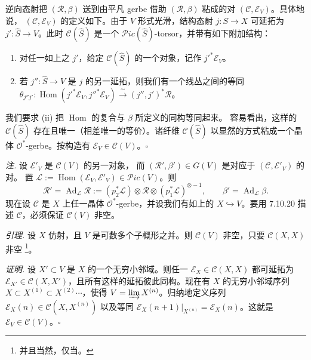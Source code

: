 

逆向态射把 $(\mathcal{R},\beta)$ 送到由平凡 gerbe 借助
$(\mathcal{R},\beta)$ 粘成的对 $(\mathcal{C},\mathcal{E}_V)$。具体地说，
$(\mathcal{C},\mathcal{E}_V)$ 的定义如下。由于 $V$ 形式光滑，结构态射
$j:S\to X$ 可延拓为 $j':\hat S\to V$。此时 $\mathcal{C}(\hat S)$ 是一个
$\mathcal{P}ic(\hat S)$-torsor，并带有如下附加结构：

\begin{enumerate}[label=(\roman*),leftmargin=2.2em]
\item 对任一如上之 $j'$，给定 $\mathcal{C}(\hat S)$ 的一个对象，记作
$j'^*\mathcal{E}_V$。
\item 若 $j'':\hat S\to V$ 是 $j$ 的另一延拓，则我们有一个线丛之间的等同
$\theta_{j''j'}:\operatorname{Hom}(j'^*\mathcal{E}_V,j''^*\mathcal{E}_V)
\xrightarrow{\ \sim\ }(j'',j')^*\mathcal{R}$。
\end{enumerate}

我们要求 (ii) 把 $\operatorname{Hom}$ 的复合与 $\beta$ 所定义的同构等同起来。
容易看出，这样的 $\mathcal{C}(\hat S)$ 存在且唯一（相差唯一的等价）。诸纤维
$\mathcal{C}(\hat S)$ 以显然的方式粘成一个晶体 $\mathcal{O}^*$-gerbe。按构造有
$\mathcal{E}_V\in\mathcal{C}(V)$。\hfill$\square$

 \emph{注.} 设 $\mathcal{E}'_V$ 是 $\mathcal{C}(V)$ 的另一对象，
而 $(\mathcal{R}',\beta')\in G(V)$ 是对应于 $(\mathcal{C},\mathcal{E}'_V)$ 的对。
置 $\mathcal{L}:=\operatorname{Hom}(\mathcal{E}_V,\mathcal{E}'_V)
\in\mathcal{P}ic(V)$。则
\[
\mathcal{R}'=\operatorname{Ad}_{\mathcal{L}}\mathcal{R}
:=(p_2^*\mathcal{L})\otimes\mathcal{R}\otimes(p_1^*\mathcal{L})^{\otimes-1},
\qquad
\beta'=\operatorname{Ad}_{\mathcal{L}}\beta .
\]
现在设 $\mathcal{C}$ 是 $X$ 上任一晶体 $\mathcal{O}^*$-gerbe，并设我们有如上的
$X\hookrightarrow V$。要用 7.10.20 描述 $\mathcal{C}$，必须保证
$\mathcal{C}(V)$ 非空。

 \emph{引理.} 设 $X$ 仿射，且 $V$ 是可数多个子概形之并。则
$\mathcal{C}(V)$ 非空，只要 $\mathcal{C}(X,X)$ 非空%
\footnote{并且当然，仅当。}。

\emph{证明.} 设 $X'\subset V$ 是 $X$ 的一个无穷小邻域。则任一
$\mathcal{E}_X\in\mathcal{C}(X,X)$ 都可延拓为
$\mathcal{E}_{X'}\in\mathcal{C}(X,X')$，且所有这样的延拓彼此同构。现在有 $X$
的无穷小邻域序列 $X\subset X^{(1)}\subset X^{(2)}\cdots$，使得
$V=\varinjlim X^{(n)}$。归纳地定义序列
$\mathcal{E}_X(n)\in\mathcal{C}(X,X^{(n)})$ 以及等同
$\mathcal{E}_X(n+1)|_{X^{(n)}}=\mathcal{E}_X(n)$。这就是
$\mathcal{E}_V\in\mathcal{C}(V)$。\hfill$\square$

